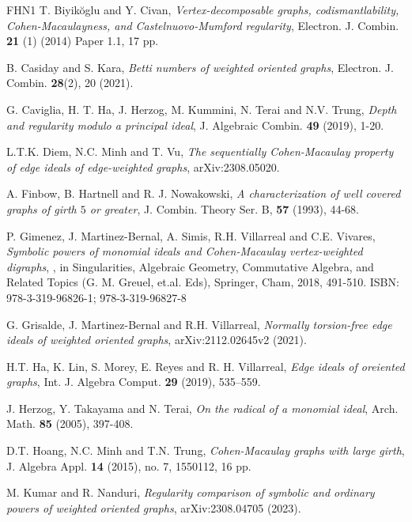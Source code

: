 \documentclass[12pt, amscd]{amsart}
\theoremstyle{definition}
\newcommand{\0}{\bold{0}}
\begin{document}
\begin{thebibliography}{FHN1}
 T. Biyik\u{o}glu and Y. Civan, {\it Vertex-decomposable graphs, codismantlability, Cohen-Macaulayness, and Castelnuovo-Mumford regularity},  Electron. J. Combin. {\bf 21} (1) (2014) Paper 1.1, 17 pp.

 B. Casiday and S. Kara, {\it Betti numbers of weighted oriented graphs}, Electron. J. Combin. {\bf 28}(2), 20 (2021).

 G.  Caviglia,  H. T.  Ha,  J.  Herzog,  M.  Kummini,  N.  Terai and N.V.  Trung,  {\it Depth and regularity modulo a principal ideal},  J. Algebraic Combin. {\bf 49} (2019), 1-20.

 L.T.K. Diem, N.C. Minh and T. Vu, {\it The sequentially Cohen-Macaulay property of edge ideals of edge-weighted graphs}, arXiv:2308.05020.

 A. Finbow, B. Hartnell and R. J. Nowakowski, {\it A characterization of well covered graphs of girth $5$ or greater}, J. Combin. Theory Ser. B, {\bf 57} (1993), 44-68.

 P. Gimenez, J. Martinez-Bernal, A. Simis, R.H. Villarreal and C.E. Vivares, {\it Symbolic powers of monomial ideals and Cohen-Macaulay vertex-weighted digraphs}, , in Singularities, Algebraic Geometry, Commutative Algebra, and Related Topics (G. M. Greuel, et.al. Eds), Springer, Cham, 2018, 491-510. ISBN: 978-3-319-96826-1; 978-3-319-96827-8

 G. Grisalde, J. Martinez-Bernal and R.H. Villarreal, {\it Normally torsion-free edge ideals of weighted oriented graphs}, arXiv:2112.02645v2 (2021).

 H.T. Ha, K. Lin, S. Morey, E. Reyes and R. H. Villarreal, {\it Edge ideals of oreiented graphs}, Int. J. Algebra Comput. {\bf 29} (2019), 535–559.

 J. Herzog, Y. Takayama and N. Terai, {\it On the radical of a monomial ideal}, Arch. Math. {\bf 85} (2005), 397-408.

 D.T.  Hoang,  N.C.  Minh and T.N. Trung,  {\it Cohen-Macaulay graphs with large girth},  J. Algebra Appl. {\bf 14} (2015),  no. 7,  1550112,  16 pp.

 M. Kumar and R. Nanduri, {\it Regularity comparison of symbolic and ordinary powers of weighted oriented graphs}, arXiv:2308.04705 (2023).


\end{thebibliography}
\end{document}
